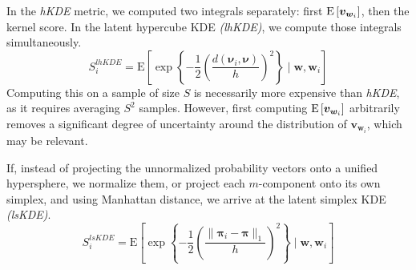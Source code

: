 In the \emph{hKDE} metric, we computed two integrals separately: first 
    $\text{E}\left[\bm{v}_{\bm{w}_i}\right]$, then the kernel score.  In the latent hypercube 
    KDE \emph{(lhKDE)}, we compute those integrals simultaneously.
    \begin{equation}
        \label{score:cat_lhkde}
        S_i^{lhKDE} = \text{E}\left[
        \exp\left\lbrace
        -\frac{1}{2}\left(
        \frac{d(\bm{\nu}_i, \bm{\nu})}{h}
        \right)^2
        \right\rbrace 
        \mid \bm{w}, \bm{w}_i
        \right]
    \end{equation}
    Computing this on a sample of size $S$ is necessarily more expensive than 
    \emph{hKDE}, as it requires averaging $S^2$ samples.  However, first 
    computing $\text{E}\left[\bm{v}_{\bm{w}_i}\right]$ arbitrarily removes a significant 
    degree of uncertainty around the distribution of $\bm{v}_{\bm{w}_i}$, which 
    may be relevant.

If, instead of projecting the unnormalized probability vectors onto a unified 
    hypersphere, we normalize them, or project each $m$-component onto its 
    own simplex, and using Manhattan distance, we arrive at the latent simplex 
    KDE \emph{(lsKDE)}.
    \begin{equation}
        \label{score:cat_lskde}
        S_i^{lsKDE} = \text{E}\left[\exp\left\lbrace
        -\frac{1}{2}\left(
        \frac{\lVert \bm{\pi}_i - \bm{\pi}\rVert_1}{h}
        \right)^2
        \right\rbrace
        \mid \bm{w},\bm{w}_i
        \right]
    \end{equation}


